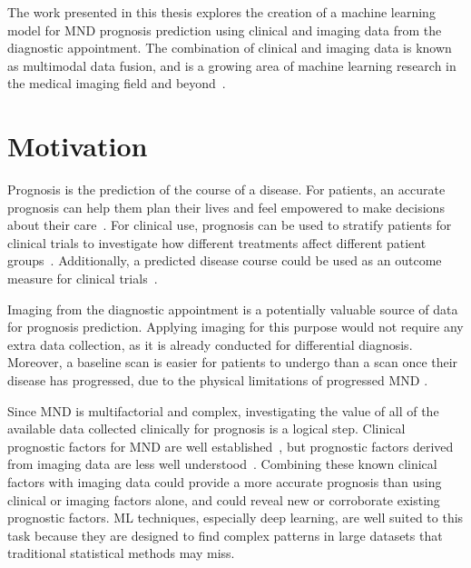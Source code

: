 The work presented in this thesis explores the creation of a machine learning model for MND prognosis prediction using clinical and imaging data from the diagnostic appointment.
The combination of clinical and imaging data is known as multimodal data fusion, and is a growing area of machine learning research in the medical imaging field and beyond~\cite{cuiDeepMultimodalFusion2022, mohsenArtificialIntelligencebasedMethods2022}.

\section{Motivation}


Prognosis is the prediction of the course of a disease.
For patients, an accurate prognosis can help them plan their lives and feel empowered to make decisions about their care~\cite{talbotClinicalToolPredicting2016, vaneenennaamDiscussingPersonalizedPrognosis2021}.
For clinical use, prognosis can be used to stratify patients for clinical trials to investigate how different treatments affect different patient groups~\cite{berryImprovedStratificationALS2018}.
Additionally, a predicted disease course could be used as an outcome measure for clinical trials~\cite{kiernanImprovingClinicalTrial2021}.

Imaging from the diagnostic appointment is a potentially valuable source of data for prognosis prediction.
Applying imaging for this purpose would not require any extra data collection, as it is already conducted for differential diagnosis.
Moreover, a baseline scan is easier for patients to undergo than a scan once their disease has progressed, due to the physical limitations of progressed MND .

Since MND is multifactorial and complex, investigating the value of all of the available data collected clinically for prognosis is a logical step.
Clinical prognostic factors for MND are well established~\cite{suPredictorsSurvivalPatients2021}, but prognostic factors derived from imaging data are less well understood~\cite{bedeLessonsALSImaging2014}.
Combining these known clinical factors with imaging data could provide a more accurate prognosis than using clinical or imaging factors alone, and could reveal new or corroborate existing prognostic factors.
ML techniques, especially deep learning, are well suited to this task because they are designed to find complex patterns in large datasets that traditional statistical methods may miss.

